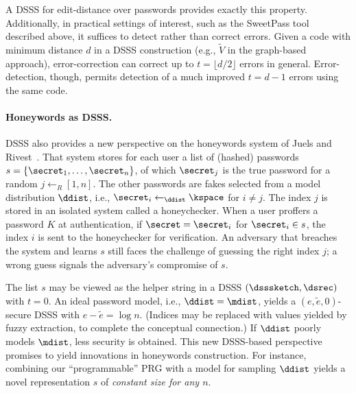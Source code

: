 A DSSS for edit-distance over passwords provides exactly this property.
Additionally, in practical settings of interest, such as the SweetPass tool
described above, it suffices to detect rather than correct errors. Given a code with minimum distance $d$ in a DSSS construction (e.g., $\tilde{V}$ in the graph-based approach), error-correction can correct up to $t = \lfloor d/2 \rfloor$ errors in general. Error-detection, though, permits detection of a much improved $t = d-1$ errors using the same code.

\paragraph{Honeywords as DSSS.} DSSS also provides a new perspective on the honeywords system of Juels and Rivest~\cite{Honeywords:2013}. That system stores for each user a list of (hashed) passwords $s = \{\secret_1, \ldots, \secret_n\}$, of which $\secret_j$ is the true password for a random $j \leftarrow_R [1,n]$. The other passwords are fakes selected from a model distribution $\ddist$, i.e., $\secret_i \leftarrow_{\ddist} \kspace$ for $i \neq j$. The index $j$ is stored in an isolated system called a honeychecker. When a user proffers a password $K$ at authentication, if $\secret = \secret_i$ for $\secret_i \in s$, the index $i$ is sent to the honeychecker for verification. An adversary that breaches the system and learns $s$ still faces the challenge of guessing the right index $j$; a wrong guess signals the adversary's compromise of $s$.

The list $s$ may be viewed as the helper string in a DSSS $(\dsssketch, \dsrec)$ with $t=0$. An ideal password model, i.e., $\ddist = \mdist$, yields a $(e, \tilde{e}, 0)$-secure DSSS with $e - \tilde{e} = \log n$. (Indices may be replaced with values yielded by fuzzy extraction, to complete the conceptual connection.) If $\ddist$ poorly models $\mdist$, less security is obtained. This new DSSS-based perspective promises to yield innovations in honeywords construction. For instance, combining our ``programmable'' PRG with a model for sampling $\ddist$ yields a novel representation $s$ of {\em constant size for any $n$}.




